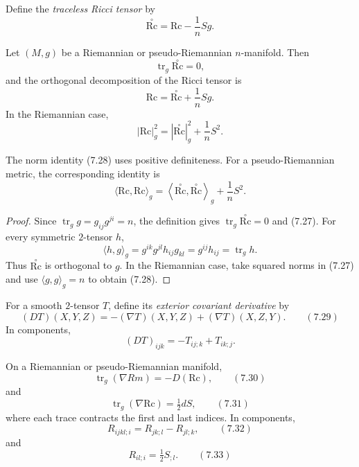 Define the \emph{traceless Ricci tensor} by
\[
\stackrel{\circ}{\mathrm{Rc}}
=\mathrm{Rc}-\frac1nSg.
\]

\begin{proposition}
\label{prop:ricci-tensor-decomposition}

Let $(M,g)$ be a Riemannian or pseudo-Riemannian $n$-manifold. Then
\[
\operatorname{tr}_g\stackrel{\circ}{\mathrm{Rc}}=0,
\]
and the orthogonal decomposition of the Ricci tensor is
\begin{equation}
\mathrm{Rc}=\stackrel{\circ}{\mathrm{Rc}}+\frac1nSg.
\tag{7.27}
\end{equation}
In the Riemannian case,
\begin{equation}
|\mathrm{Rc}|_g^2
=|\stackrel{\circ}{\mathrm{Rc}}|_g^2+\frac1nS^2.
\tag{7.28}
\end{equation}
\end{proposition}

\begin{remark}
The norm identity (7.28) uses positive definiteness. For a
pseudo-Riemannian metric, the corresponding identity is
\[
\langle\mathrm{Rc},\mathrm{Rc}\rangle_g
=\left\langle\stackrel{\circ}{\mathrm{Rc}},
\stackrel{\circ}{\mathrm{Rc}}\right\rangle_g+\frac1nS^2.
\]
\end{remark}

\begin{proof}
\sketch Since
$\operatorname{tr}_gg=g_{ij}g^{ji}=n$, the definition gives
$\operatorname{tr}_g\stackrel{\circ}{\mathrm{Rc}}=0$ and (7.27). For every
symmetric $2$-tensor $h$,
\[
\langle h,g\rangle_g
=g^{ik}g^{jl}h_{ij}g_{kl}
=g^{ij}h_{ij}
=\operatorname{tr}_gh.
\]
Thus $\stackrel{\circ}{\mathrm{Rc}}$ is orthogonal to $g$. In the Riemannian
case, take squared norms in (7.27) and use
$\langle g,g\rangle_g=n$ to obtain (7.28).
\end{proof}

For a smooth $2$-tensor $T$, define its \emph{exterior covariant derivative}
by
\[
(DT)(X,Y,Z)=-(\nabla T)(X,Y,Z)+(\nabla T)(X,Z,Y).
\qquad (7.29)
\]
In components,
\[
(DT)_{ijk}=-T_{ij;k}+T_{ik;j}.
\]

\begin{proposition}
\label{prop:contracted-bianchi-identities}


On a Riemannian or pseudo-Riemannian manifold,
\[
\operatorname{tr}_g(\nabla Rm)=-D(\mathrm{Rc}),
\qquad (7.30)
\]
and
\[
\operatorname{tr}_g(\nabla\mathrm{Rc})=\tfrac12dS,
\qquad (7.31)
\]
where each trace contracts the first and last indices. In components,
\[
R_{ijkl;i}=R_{jk;l}-R_{jl;k},
\qquad (7.32)
\]
and
\[
R_{il;i}=\tfrac12S_{;l}.
\qquad (7.33)
\]
\end{proposition}

